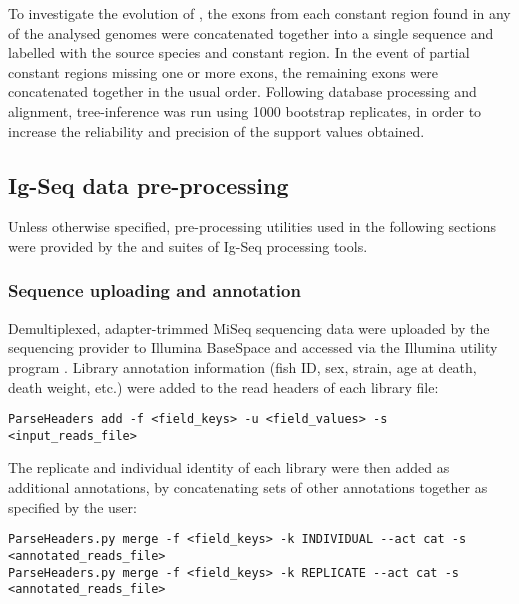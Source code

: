 \noindent To investigate the evolution of , the  exons from each  constant region found in any of the analysed genomes were concatenated together into a single sequence and labelled with the source species and constant region. In the event of partial constant regions missing one or more \cz{} exons, the remaining exons were concatenated together in the usual order. Following database processing and alignment,  tree-inference was run using 1000 bootstrap replicates, in order to increase the reliability and precision of the support values obtained. %

\subsection{Ig-Seq data pre-processing}
\label{sec:methods_comp_igpreproc}

Unless otherwise specified, pre-processing utilities used in the following sections were provided by the  \parencite{vanderheiden2014presto} and  \parencite{gupta2015changeo} suites of Ig-Seq processing tools.

\subsubsection{Sequence uploading and annotation}
\label{sec:methods_comp_igpreproc_annot}

Demultiplexed, adapter-trimmed MiSeq sequencing data were uploaded by the sequencing provider to Illumina BaseSpace and accessed via the Illumina utility program . Library annotation information (fish ID, sex, strain, age at death, death weight, etc.) were added to the read headers of each library  file:

\begin{lstlisting}
ParseHeaders add -f <field_keys> -u <field_values> -s <input_reads_file>
\end{lstlisting}

\noindent The replicate and individual identity of each library were then added as additional annotations, by concatenating sets of other annotations together as specified by the user:

\begin{lstlisting}
ParseHeaders.py merge -f <field_keys> -k INDIVIDUAL --act cat -s <annotated_reads_file>
ParseHeaders.py merge -f <field_keys> -k REPLICATE --act cat -s <annotated_reads_file>
\end{lstlisting}

